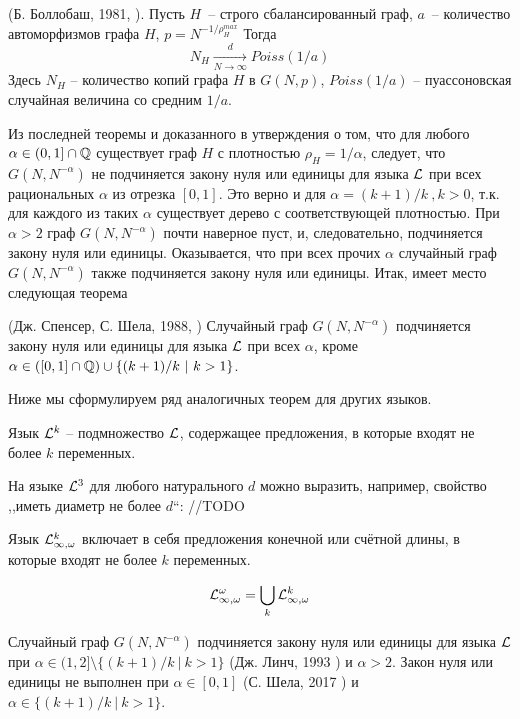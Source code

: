 \documentclass{mipt-thesis-bs}
\begin{document}
\begin{theorem} (Б. Боллобаш, 1981, \cite{bollobas1981threshold}). Пусть $H$~-- строго сбалансированный граф, $a$~-- количество автоморфизмов графа $H$, $p = N^{-1/ \rho^{max}_H}$
Тогда
\[N_H \xrightarrow[N\rightarrow \infty]{d} Poiss(1/a) \]
Здесь $N_H$ -- количество копий графа $H$ в $G(N, p)$, $Poiss(1/a)$ -- пуассоновская случайная величина со средним $1/a$.
\end{theorem}
Из последней теоремы и доказанного в \cite{rucinski1986strongly} утверждения о том, что для любого $\alpha \in (0,1] \cap \mathbb {Q}$ существует граф $H$ с плотностью $\rho_H = 1/\alpha$, следует, что $G(N,N^{-\alpha})$ не подчиняется закону нуля или единицы для языка $\mathcal{L}$ при всех рациональных $\alpha$ из отрезка $[0,1]$.
Это верно и для $\alpha = (k+1)/k~, k > 0$, т.к. для каждого из таких $\alpha$ существует дерево с соответствующей плотностью.
При $\alpha > 2$ граф $G(N, N^{-\alpha})$ почти наверное пуст, и, следовательно, подчиняется закону нуля или единицы.
Оказывается, что при всех прочих $\alpha$ случайный граф $G(N, N^{-\alpha})$ также подчиняется закону нуля или единицы.
Итак, имеет место следующая теорема
\begin{theorem} (Дж. Спенсер, С. Шела, 1988, \cite{shelah1988zero})
Случайный граф $G(N, N^{-\alpha})$ подчиняется закону нуля или единицы для языка $\mathcal{L}$ при всех $\alpha$, кроме $\alpha \in \left([0,1] \cap \mathbb {Q} \right) \cup \{(k+1)/k ~|~ k > 1\}$.
\end{theorem}

Ниже мы сформулируем ряд аналогичных теорем для других языков.

\Def Язык $\mathcal{L}^k$ -- подмножество $\mathcal{L}$, содержащее предложения, в которые входят не более $k$ переменных.

На языке $\mathcal{L}^3$ для любого натурального $d$ можно выразить, например, свойство ,,иметь диаметр не более $d$``: //TODO

\Def Язык $\mathcal{L}^k_{\infty, \omega}$ включает в себя предложения конечной или счётной длины, в которые входят не более $k$ переменных.

\Def \[\mathcal{L}^\omega_{\infty, \omega} = \bigcup_k \mathcal{L}^k_{\infty, \omega} \]

\begin{theorem}
Случайный граф $G(N, N^{-\alpha})$ подчиняется закону нуля или единицы для языка $\mathcal{L}$ при $\alpha \in (1,2] \setminus \{(k+1)/k ~|~ k > 1\}$ (Дж. Линч, 1993  \cite{lynch1993infinitary}) и $\alpha > 2$.
Закон нуля или единицы не выполнен при $\alpha \in [0,1]$ (С. Шела, 2017 \cite{shelah2017failure})  и $\alpha \in \{(k+1)/k ~|~ k > 1\}$.
\end{theorem}
\end{document}
